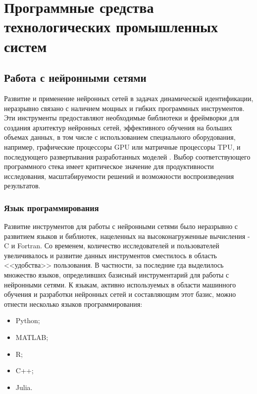 \chapter{Программные средства технологических промышленных систем}



\section{Работа с нейронными сетями}

Развитие и применение нейронных сетей в задачах
динамической идентификации, неразрывно связано с
наличием мощных и гибких программных инструментов.
Эти инструменты предоставляют необходимые библиотеки
и фреймворки для создания архитектур нейронных
сетей, эффективного обучения на больших объемах
данных, в том числе с использованием специального
оборудования, например, графические процессоры GPU
или матричные процессоры TPU, и последующего
развертывания разработанных моделей \cite{bib:tools:ml}. Выбор
соответствующего программного стека имеет
критическое значение для продуктивности
исследования, масштабируемости решений и возможности
воспроизведения результатов.

\subsection{Язык программирования}

Развитие инструментов для работы с нейронными сетями было неразрывно с
развитием языков и библиотек, нацеленных на высоконагруженные вычисления - C и
Fortran. Со временем, количество исследователей и пользователей увеличивалось и
развитие данных инструментов сместилось в область <<удобства>> пользования. В
частности, за последние гда выделилось множество языков, определивших базисный
инструментарий для работы с нейронными сетями. К языкам, активно используемых в
области машинного обучения и разработки нейронных сетей и составляющим этот
базис, можно отнести несколько языков программирования:

\begin{itemize}
  \item Python;
  \item MATLAB;
  \item R;
  \item C++;
  \item Julia.
\end{itemize}

